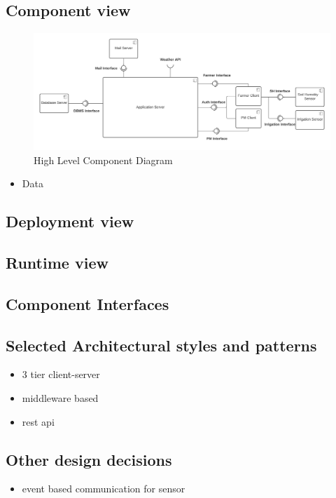\documentclass[10pt]{article} %
\begin{document}
\subsection{Component view}
\begin{figure}[h]
    \centering
    \includegraphics[scale=0.5]{images/hl_component.png}
    \caption{High Level Component Diagram}
    \label{fig:hl_component}
\end{figure}
\begin{itemize}
    \item Data
\end{itemize}
\subsection{Deployment view}
\subsection{Runtime view}
\subsection{Component Interfaces}
\subsection{Selected Architectural styles and patterns}
\begin{itemize}
    \item 3 tier client-server
    \item middleware based
    \item rest api  
\end{itemize}
\subsection{Other design decisions}
\begin{itemize}
    \item event based communication for sensor
\end{itemize}
\end{document}
